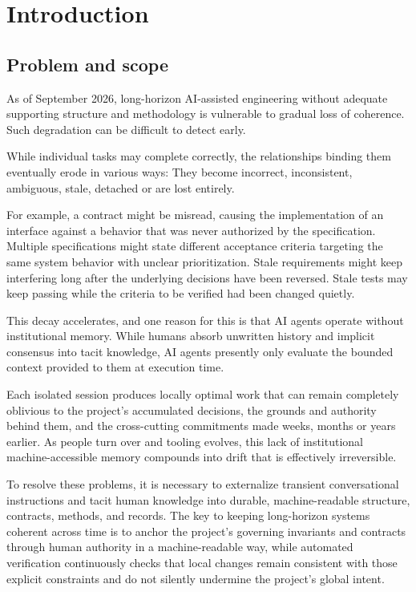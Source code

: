 \section{Introduction}

\subsection{Problem and scope}

As of September 2026, long-horizon AI-assisted engineering without adequate supporting structure and methodology is vulnerable to gradual loss of coherence. Such degradation can be difficult to detect early.

While individual tasks may complete correctly, the relationships binding them eventually erode in various ways: They become incorrect, inconsistent, ambiguous, stale, detached or are lost entirely.

For example, a contract might be misread, causing the implementation of an interface against a behavior that was never authorized by the specification. Multiple specifications might state different acceptance criteria targeting the same system behavior with unclear prioritization. Stale requirements might keep interfering long after the underlying decisions have been reversed. Stale tests may keep passing while the criteria to be verified had been changed quietly.

This decay accelerates, and one reason for this is that AI agents operate without institutional memory. While humans absorb unwritten history and implicit consensus into tacit knowledge, AI agents presently only evaluate the bounded context provided to them at execution time.

Each isolated session produces locally optimal work that can remain completely oblivious to the project's accumulated decisions, the grounds and authority behind them, and the cross-cutting commitments made weeks, months or years earlier. As people turn over and tooling evolves, this lack of institutional machine-accessible memory compounds into drift that is effectively irreversible.

To resolve these problems, it is necessary to externalize transient conversational instructions and tacit human knowledge into durable, machine-readable structure, contracts, methods, and records. The key to keeping long-horizon systems coherent across time is to anchor the project's governing invariants and contracts through human authority in a machine-readable way, while automated verification continuously checks that local changes remain consistent with those explicit constraints and do not silently undermine the project's global intent.


